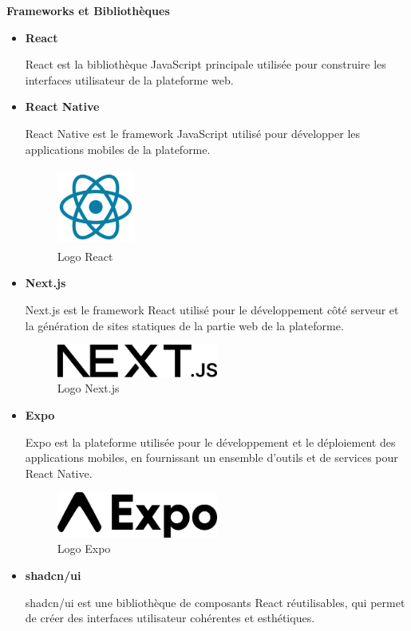 \textbf{Frameworks et Bibliothèques}
\begin{itemize}
  \item \textbf{React}

    React est la bibliothèque JavaScript principale utilisée pour construire
    les interfaces utilisateur de la plateforme web.

  \item \textbf{React Native}

    React Native est le framework JavaScript utilisé pour développer les
    applications mobiles de la plateforme.

    \begin{figure}[H]
      \centering
      \includegraphics[width=1.0in, height=1.0in]{images/React_Logo_SVG.svg.png}
      \caption{Logo React}
    \end{figure}

  \item \textbf{Next.js}

    Next.js est le framework React utilisé pour le développement côté serveur
    et la génération de sites statiques de la partie web de la plateforme.

    \begin{figure}[H]
      \centering
      \includegraphics[width=0.5\textwidth]{images/Nextjs-logo.svg.png}
      \caption{Logo Next.js}
    \end{figure}

  \item \textbf{Expo}

    Expo est la plateforme utilisée pour le développement et le déploiement
    des applications mobiles, en fournissant un ensemble d'outils et de
    services pour React Native.

    \begin{figure}[H]
      \centering
      \includegraphics[width=0.5\textwidth]{images/logo-wordmark.png}
      \caption{Logo Expo}
    \end{figure}

  \item \textbf{shadcn/ui}

    shadcn/ui est une bibliothèque de composants React réutilisables, qui
    permet de créer des interfaces utilisateur cohérentes et esthétiques.
\end{itemize}

